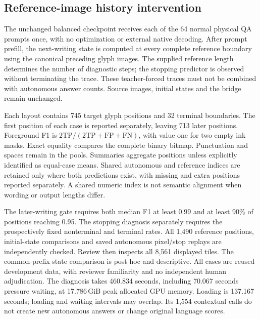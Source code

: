 \subsection*{Reference-image history intervention}
The unchanged balanced checkpoint receives each of the 64 normal physical QA
prompts once, with no optimization or external native decoding. After prompt
prefill, the next-writing state is computed at every complete reference boundary
using the canonical preceding glyph images. The supplied reference length
determines the number of diagnostic steps; the stopping predictor is observed
without terminating the trace. These teacher-forced traces must not be combined
with autonomous answer counts. Source images, initial states and the bridge
remain unchanged.

Each layout contains 745 target glyph positions and 32 terminal boundaries.
The first position of each case is reported separately, leaving 713 later
positions. Foreground F1 is $2\mathrm{TP}/(2\mathrm{TP}+\mathrm{FP}+\mathrm{FN})$,
with value one for two empty ink masks. Exact equality compares the complete
binary bitmap. Punctuation and spaces remain in the pools. Summaries aggregate
positions unless explicitly identified as equal-case means. Shared autonomous
and reference indices are retained only where both predictions exist, with
missing and extra positions reported separately. A shared numeric index is not
semantic alignment when wording or output lengths differ.

The later-writing gate requires both median F1 at least 0.99 and at least
90\% of positions reaching 0.95. The stopping diagnosis separately requires
the prospectively fixed nonterminal and terminal rates. All 1,490 reference
positions, initial-state comparisons and saved autonomous pixel/stop replays
are independently checked. Review then inspects all 8,561 displayed tiles.
The common-prefix state comparison is post hoc and descriptive. All cases are
reused development data, with reviewer familiarity and no independent human
adjudication. The diagnosis takes 460.834 seconds, including 70.067 seconds
pressure waiting, at 17.786\,GiB peak allocated GPU memory. Loading is 137.167
seconds; loading and waiting intervals may overlap. Its 1,554 contextual calls
do not create new autonomous answers or change original language scores.


